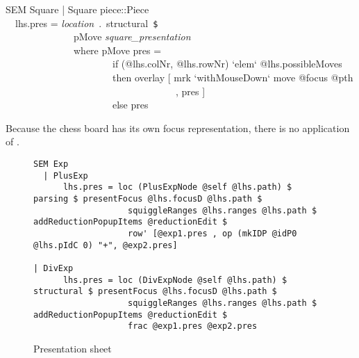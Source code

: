 \ttfamily\begin{small}\begin{tabbing}
SEM Square | Square piece::Piece\\
~~lhs.pres = {\em location}~.~structural~\verb|$|\\
~~~~~~~~~~~~~~pMove {\em square\_presentation}\\
~~~~~~~~~~~~~~where pMove pres =\\
~~~~~~~~~~~~~~~~~~~~~~if (@lhs.colNr, @lhs.rowNr) `elem` @lhs.possibleMoves\\
~~~~~~~~~~~~~~~~~~~~~~then overlay [ mrk `withMouseDown` move @focus @pth\\
~~~~~~~~~~~~~~~~~~~~~~~~~~~~~~~~~~~, pres ]\\
~~~~~~~~~~~~~~~~~~~~~~else pres\\
\end{tabbing}\end{small}\rmfamily

Because the chess board has its own focus representation, there is no application of .

\finalshortpage


\bc
\begin{figure}
\begin{small}
\begin{center}
\begin{footnotesize}
\begin{verbatim}
SEM Exp
  | PlusExp
      lhs.pres = loc (PlusExpNode @self @lhs.path) $ parsing $ presentFocus @lhs.focusD @lhs.path $
                   squiggleRanges @lhs.ranges @lhs.path $ addReductionPopupItems @reductionEdit $
                   row' [@exp1.pres , op (mkIDP @idP0 @lhs.pIdC 0) "+", @exp2.pres]

| DivExp      
      lhs.pres = loc (DivExpNode @self @lhs.path) $ structural $ presentFocus @lhs.focusD @lhs.path $
                   squiggleRanges @lhs.ranges @lhs.path $ addReductionPopupItems @reductionEdit $
                   frac @exp1.pres @exp2.pres
\end{verbatim}
\end{footnotesize}
\caption{Presentation sheet}\label{presSheetExample} 
\end{center}
\end{small}
\end{figure}
\ec

